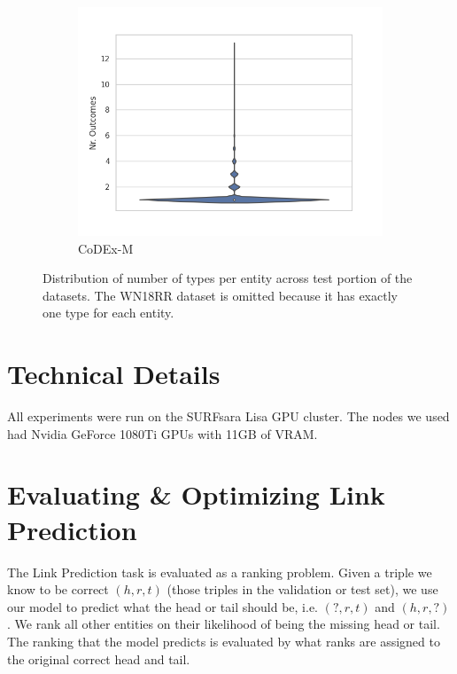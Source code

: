 \begin{figure}
\begin{subfigure}[b]{0.32\textwidth}
        \includegraphics[trim=0cm 11mm 1cm 0pt, clip]{figures/datasets/codex-m.png}
        \caption{CoDEx-M}
    \end{subfigure}
    \caption[Distribution of number of types per entity.]{Distribution of number of types per entity across test portion of the datasets. The WN18RR dataset is omitted because it has exactly one type for each entity.}
    \label{fig:my_label}
\end{figure}



\section{Technical Details}
All experiments were run on the SURFsara Lisa GPU cluster. 
The nodes we used had Nvidia GeForce 1080Ti GPUs with 11GB of VRAM.


\section{Evaluating \& Optimizing Link Prediction}
The Link Prediction task is evaluated as a ranking problem. Given a triple we know to be correct $(h, r, t)$ (those triples in the validation or test set), we use our model to predict what the head or tail should be, i.e. $(?, r, t)$ and $(h, r, ?)$. We rank all other entities on their likelihood of being the missing head or tail. 
The ranking that the model predicts is evaluated by what ranks are assigned to the original correct head and tail.

